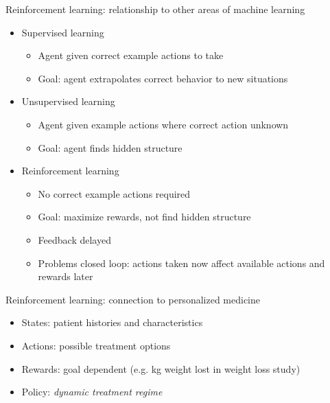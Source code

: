 \documentclass{beamer}
\begin{document}
%
%
%

\begin{frame}[c]{Reinforcement learning: relationship to other areas of machine learning}
\begin{itemize}[<+->]
  \item Supervised learning
  \begin{itemize}
    \item Agent given correct example actions to take
    \item Goal: agent extrapolates correct behavior to new situations
  \end{itemize}
  \item Unsupervised learning
  \begin{itemize}
    \item Agent given example actions where correct action unknown
    \item Goal: agent finds hidden structure
  \end{itemize} 
  \item Reinforcement learning
\begin{itemize}
  \item No correct example actions required
  \item Goal: maximize rewards, not find hidden structure
  \item Feedback delayed 
  \item Problems closed loop: actions taken now affect available actions and rewards later
\end{itemize} 
\end{itemize}
\end{frame}


\begin{frame}[c]{Reinforcement learning: connection to personalized medicine}
  
  \begin{itemize}[<+->]
      \item States: patient histories and characteristics
      \item Actions: possible treatment options
      \item Rewards: goal dependent (e.g. kg weight lost in weight loss study)
      \item Policy: \emph{dynamic treatment regime} 
  \end{itemize}

\end{frame}
\end{document}

